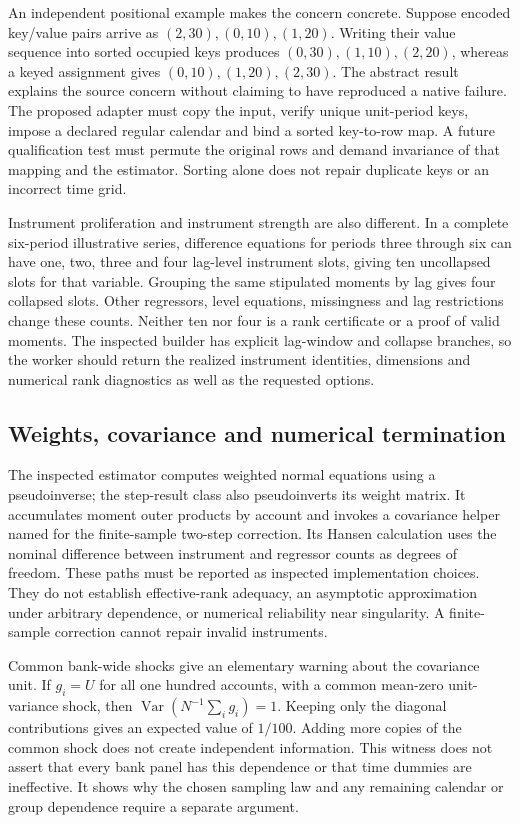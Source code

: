 An independent positional example makes the concern concrete. Suppose encoded key/value
pairs arrive as $(2,30),(0,10),(1,20)$. Writing their value sequence into sorted occupied
keys produces $(0,30),(1,10),(2,20)$, whereas a keyed assignment gives
$(0,10),(1,20),(2,30)$. The abstract result explains the source concern without claiming
to have reproduced a native failure. The proposed adapter must copy the input, verify
unique unit-period keys, impose a declared regular calendar and bind a sorted key-to-row
map. A future qualification test must permute the original rows and demand invariance
of that mapping and the estimator. Sorting alone does not repair duplicate keys or an
incorrect time grid.\citep{exec24_pydynpd_reference}

Instrument proliferation and instrument strength are also different. In a complete
six-period illustrative series, difference equations for periods three through six
can have one, two, three and four lag-level instrument slots, giving ten uncollapsed
slots for that variable. Grouping the same stipulated moments by lag gives four
collapsed slots. Other regressors, level equations, missingness and lag restrictions
change these counts. Neither ten nor four is a rank certificate or a proof of valid
moments. The inspected builder has explicit lag-window and collapse branches, so the
worker should return the realized instrument identities, dimensions and numerical
rank diagnostics as well as the requested options.\citep{exec24_pydynpd_source,exec24_pydynpd_reference}

\subsection{Weights, covariance and numerical termination}
The inspected estimator computes weighted normal equations using a pseudoinverse;
the step-result class also pseudoinverts its weight matrix. It accumulates moment
outer products by account and invokes a covariance helper named for the finite-sample
two-step correction. Its Hansen calculation uses the nominal difference between
instrument and regressor counts as degrees of freedom. These paths must be reported
as inspected implementation choices. They do not establish effective-rank adequacy,
an asymptotic approximation under arbitrary dependence, or numerical reliability near
singularity. A finite-sample correction cannot repair invalid instruments.
\citep{exec24_pydynpd_source,blundellbond2023}

Common bank-wide shocks give an elementary warning about the covariance unit. If
$g_i=U$ for all one hundred accounts, with a common mean-zero unit-variance shock,
then $\operatorname{Var}(N^{-1}\sum_i g_i)=1$. Keeping only the diagonal contributions
gives an expected value of $1/100$. Adding more copies of the common shock does not
create independent information. This witness does not assert that every bank panel
has this dependence or that time dummies are ineffective. It shows why the chosen
sampling law and any remaining calendar or group dependence require a separate
argument.\citep{exec24_pydynpd_reference}

